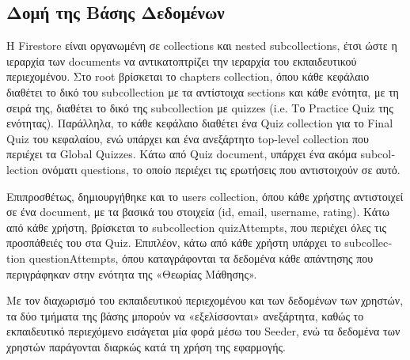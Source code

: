\documentclass{article}
\begin{document}
\subsection{Δομή της Βάσης Δεδομένων}
Η \foreignlanguage{english}{Firestore} είναι οργανωμένη σε \foreignlanguage{english}{collections} και \foreignlanguage{english}{nested subcollections}, έτσι ώστε η ιεραρχία των \foreignlanguage{english}{documents} να αντικατοπτρίζει την ιεραρχία του εκπαιδευτικού περιεχομένου. Στο \foreignlanguage{english}{root} βρίσκεται το \foreignlanguage{english}{chapters collection}, όπου κάθε κεφάλαιο διαθέτει το δικό του \foreignlanguage{english}{subcollection} με τα αντίστοιχα \foreignlanguage{english}{sections} και κάθε ενότητα, με τη σειρά της, διαθέτει το δικό της \foreignlanguage{english}{subcollection} με \foreignlanguage{english}{quizzes} (\foreignlanguage{english}{i.e.} Το \foreignlanguage{english}{Practice Quiz} της ενότητας). Παράλληλα, το κάθε κεφάλαιο διαθέτει ένα \foreignlanguage{english}{Quiz collection} για το \foreignlanguage{english}{Final Quiz} του κεφαλαίου, ενώ υπάρχει και ένα ανεξάρτητο \foreignlanguage{english}{top-level collection} που περιέχει τα \foreignlanguage{english}{Global Quizzes}. Κάτω από \foreignlanguage{english}{Quiz document}, υπάρχει ένα ακόμα \foreignlanguage{english}{subcollection} ονόματι \foreignlanguage{english}{questions}, το οποίο περιέχει τις ερωτήσεις που αντιστοιχούν σε αυτό.

Επιπροσθέτως, δημιουργήθηκε και το \foreignlanguage{english}{users collection}, όπου κάθε χρήστης αντιστοιχεί σε ένα \foreignlanguage{english}{document}, με τα βασικά του στοιχεία (\foreignlanguage{english}{id}, \foreignlanguage{english}{email}, \foreignlanguage{english}{username}, \foreignlanguage{english}{rating}). Κάτω από κάθε χρήστη, βρίσκεται το \foreignlanguage{english}{subcollection} \foreignlanguage{english}{quizAttempts}, που περιέχει όλες τις προσπάθειές του στα \foreignlanguage{english}{Quiz}. Επιπλέον, κάτω από κάθε χρήστη υπάρχει το \foreignlanguage{english}{subcollection} \foreignlanguage{english}{questionAttempts}, όπου καταγράφονται τα δεδομένα κάθε απάντησης που περιγράφηκαν στην ενότητα της «Θεωρίας Μάθησης».

Με τον διαχωρισμό του εκπαιδευτικού περιεχομένου και των δεδομένων των χρηστών, τα δύο τμήματα της βάσης μπορούν να «εξελίσσονται» ανεξάρτητα, καθώς το εκπαιδευτικό περιεχόμενο εισάγεται μία φορά μέσω του \foreignlanguage{english}{Seeder}, ενώ τα δεδομένα των χρηστών παράγονται διαρκώς κατά τη χρήση της εφαρμογής.
\end{document}
